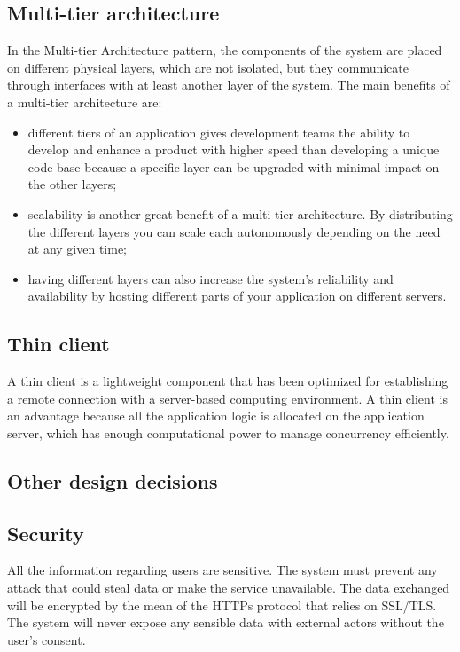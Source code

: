 \documentclass[../../dd.tex]{subfiles}
\begin{document}
    \subsection{Multi-tier architecture} In the Multi-tier Architecture pattern, the components
    of the system are placed on different physical layers, which are not
    isolated, but they communicate through interfaces with at least another layer
    of the system. The main benefits of a multi-tier architecture are:
    \begin{itemize}
        \item  different tiers of an application gives development teams the
        ability to develop and enhance a product with higher speed than developing
        a unique code base because a specific layer can be upgraded with minimal
        impact on the other layers;
        \item scalability is another great benefit of a multi-tier
        architecture. By distributing the different layers you can scale each
        autonomously depending on the need at any given time;
        \item  having different layers can also increase the system’s reliability and availability
        by hosting different parts of your application on different servers.
    \end{itemize}

    \subsection{Thin client} A thin client is a lightweight component that has been optimized for establishing a remote connection with a server-based computing environment.
    A thin client is an advantage because all the application logic is allocated on the application server, which has enough computational power to manage concurrency efficiently.

    \subsection{Other design decisions}
    \subsection{Security}
    All the information regarding users are sensitive. The system must prevent any attack that could steal data or make the service unavailable. The data exchanged will be encrypted by the mean of the HTTPs protocol that relies on SSL/TLS. The system will never expose any sensible data with external actors without the user's consent.
\end{document}
